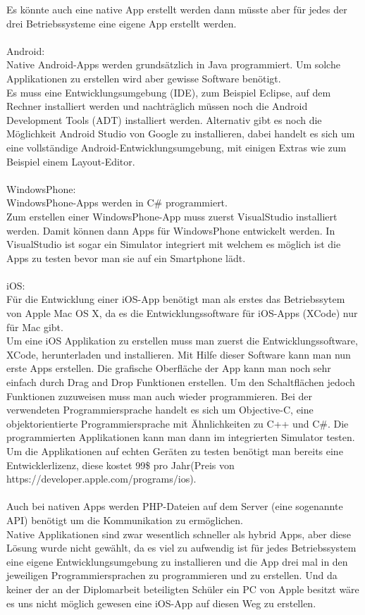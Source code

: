 Es könnte auch eine native App erstellt werden dann müsste aber für jedes der drei Betriebssysteme eine eigene App erstellt werden.\\
\\
Android:\\
Native Android-Apps werden grundsätzlich in Java programmiert. Um solche Applikationen zu erstellen wird aber gewisse Software benötigt.\\
Es muss eine Entwicklungsumgebung (IDE), zum Beispiel Eclipse, auf dem Rechner installiert werden und nachträglich müssen noch die Android Development Tools (ADT) installiert werden. Alternativ gibt es noch die Möglichkeit Android Studio von Google zu installieren, dabei handelt es sich um eine vollständige Android-Entwicklungsumgebung, mit einigen Extras wie zum Beispiel einem Layout-Editor.\\
\\
WindowsPhone:\\
WindowsPhone-Apps werden in C\# programmiert.\\
Zum erstellen einer WindowsPhone-App muss zuerst VisualStudio installiert werden. Damit können dann Apps für WindowsPhone entwickelt werden. In VisualStudio ist sogar ein Simulator integriert mit welchem es möglich ist die Apps zu testen bevor man sie auf ein Smartphone lädt.\\
\\
iOS:\\
Für die Entwicklung einer iOS-App benötigt man als erstes das Betriebssytem von Apple Mac OS X, da es die Entwicklungssoftware für iOS-Apps (XCode) nur für Mac gibt.\\
Um eine iOS Applikation zu erstellen muss man zuerst die Entwicklungssoftware, XCode, herunterladen und installieren. Mit Hilfe dieser Software kann man nun erste Apps erstellen. Die grafische Oberfläche der App kann man noch sehr einfach durch Drag and Drop Funktionen erstellen. Um den Schaltflächen jedoch Funktionen zuzuweisen muss man auch wieder programmieren. Bei der verwendeten Programmiersprache handelt es sich um Objective-C, eine objektorientierte Programmiersprache mit Ähnlichkeiten zu C++ und C\#.
Die programmierten Applikationen kann man dann im integrierten Simulator testen.
Um die Applikationen auf echten Geräten zu testen benötigt man bereits eine Entwicklerlizenz, diese kostet 99\$ pro Jahr(Preis von https://developer.apple.com/programs/ios).\\
\\
Auch bei nativen Apps werden PHP-Dateien auf dem Server (eine sogenannte API) benötigt um die Kommunikation zu ermöglichen.\\
Native Applikationen sind zwar wesentlich schneller als hybrid Apps, aber diese Lösung wurde nicht gewählt, da es viel zu aufwendig ist für jedes Betriebssystem eine eigene Entwicklungsumgebung zu installieren und die App drei mal in den jeweiligen Programmiersprachen zu programmieren und zu erstellen. Und da keiner der an der Diplomarbeit beteiligten Schüler ein PC von Apple besitzt wäre es uns nicht möglich gewesen eine iOS-App auf diesen Weg zu erstellen.\\

